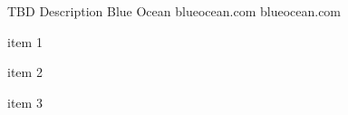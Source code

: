 \begin{cventries}
\cventry
{TBD Description} %
{Blue Ocean} %
{blueocean.com} %
{blueocean.com} %
{
  \begin{cvitems} %
    \item {item 1}
    \item {item 2}
    \item {item 3}
  \end{cvitems}
}

\end{cventries}
